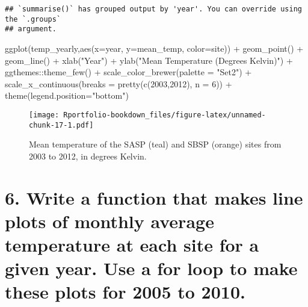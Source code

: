\documentclass[
]{book}
\newenvironment{Shaded}{\begin{snugshade}}{\end{snugshade}}
\newcommand{\AttributeTok}[1]{\textcolor[rgb]{0.77,0.63,0.00}{#1}}
\newcommand{\DecValTok}[1]{\textcolor[rgb]{0.00,0.00,0.81}{#1}}
\newcommand{\FunctionTok}[1]{\textcolor[rgb]{0.00,0.00,0.00}{#1}}
\newcommand{\NormalTok}[1]{#1}
\newcommand{\SpecialCharTok}[1]{\textcolor[rgb]{0.00,0.00,0.00}{#1}}
\newcommand{\StringTok}[1]{\textcolor[rgb]{0.31,0.60,0.02}{#1}}
\begin{document}
\begin{verbatim}
## `summarise()` has grouped output by 'year'. You can override using the `.groups`
## argument.
\end{verbatim}

\begin{Shaded}
\begin{Highlighting}[]
\FunctionTok{ggplot}\NormalTok{(temp\_yearly,}\FunctionTok{aes}\NormalTok{(}\AttributeTok{x=}\NormalTok{year, }\AttributeTok{y=}\NormalTok{mean\_temp, }\AttributeTok{color=}\NormalTok{site)) }\SpecialCharTok{+} 
  \FunctionTok{geom\_point}\NormalTok{() }\SpecialCharTok{+} \FunctionTok{geom\_line}\NormalTok{() }\SpecialCharTok{+}
  \FunctionTok{xlab}\NormalTok{(}\StringTok{"Year"}\NormalTok{) }\SpecialCharTok{+} \FunctionTok{ylab}\NormalTok{(}\StringTok{"Mean Temperature (Degrees Kelvin)"}\NormalTok{) }\SpecialCharTok{+}
\NormalTok{  ggthemes}\SpecialCharTok{::}\FunctionTok{theme\_few}\NormalTok{() }\SpecialCharTok{+} 
  \FunctionTok{scale\_color\_brewer}\NormalTok{(}\AttributeTok{palette =} \StringTok{"Set2"}\NormalTok{) }\SpecialCharTok{+} 
  \FunctionTok{scale\_x\_continuous}\NormalTok{(}\AttributeTok{breaks =} \FunctionTok{pretty}\NormalTok{(}\FunctionTok{c}\NormalTok{(}\DecValTok{2003}\NormalTok{,}\DecValTok{2012}\NormalTok{), }\AttributeTok{n =} \DecValTok{6}\NormalTok{)) }\SpecialCharTok{+}
  \FunctionTok{theme}\NormalTok{(}\AttributeTok{legend.position=}\StringTok{"bottom"}\NormalTok{)}
\end{Highlighting}
\end{Shaded}

\begin{figure}
\centering
\texttt{[image: Rportfolio-bookdown\_files/figure-latex/unnamed-chunk-17-1.pdf]}
\caption{\label{fig:unnamed-chunk-17}Mean temperature of the SASP (teal) and SBSP (orange) sites from 2003 to 2012, in degrees Kelvin.}
\end{figure}

\hypertarget{write-a-function-that-makes-line-plots-of-monthly-average-temperature-at-each-site-for-a-given-year.-use-a-for-loop-to-make-these-plots-for-2005-to-2010.}{%
\section{6. Write a function that makes line plots of monthly average temperature at each site for a given year. Use a for loop to make these plots for 2005 to 2010.}\label{write-a-function-that-makes-line-plots-of-monthly-average-temperature-at-each-site-for-a-given-year.-use-a-for-loop-to-make-these-plots-for-2005-to-2010.}}
\end{document}
